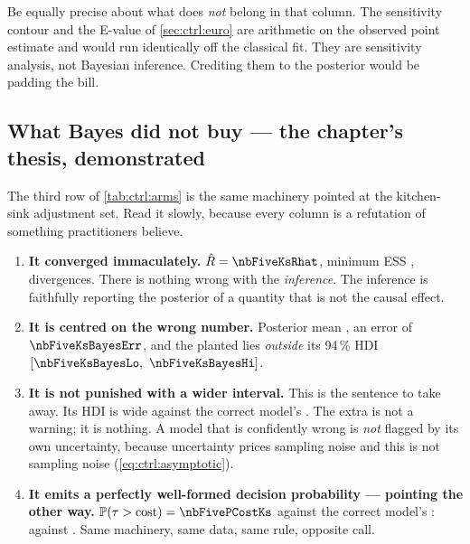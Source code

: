 Be equally precise about what does \emph{not} belong in that column. The sensitivity contour and
the E-value of \cref{sec:ctrl:euro} are arithmetic on the observed point estimate and would run
identically off the classical fit. They are sensitivity analysis, not Bayesian inference.
Crediting them to the posterior would be padding the bill.

\subsection*{What Bayes did not buy --- the chapter's thesis, demonstrated}

The third row of \cref{tab:ctrl:arms} is the same machinery pointed at the kitchen-sink
adjustment set. Read it slowly, because every column is a refutation of something practitioners
believe.

\begin{enumerate}[leftmargin=*, itemsep=.3em]
  \item \textbf{It converged immaculately.} $\hat R = \nbFiveKsRhat$, minimum ESS
        \nbFiveKsEss{}, \nbFiveKsDivergences{} divergences. There is nothing wrong with the
        \emph{inference}. The inference is faithfully reporting the posterior of a quantity that
        is not the causal effect.
  \item \textbf{It is centred on the wrong number.} Posterior mean \eur{\nbFiveKsBayesEst},
        an error of $\nbFiveKsBayesErr$, and the planted \eur{\nbFiveTrueAte} lies
        \emph{outside} its 94\,\% HDI $[\nbFiveKsBayesLo,\ \nbFiveKsBayesHi]$.
  \item \textbf{It is not punished with a wider interval.} This is the sentence to take away. Its
        HDI is \eur{\nbFiveKsBayesWidth} wide against the correct model's
        \eur{\nbFiveBayesWidth}. The extra \eur{\nbFiveKsWidthGap} is not a warning; it is
        nothing. A model
        that is confidently wrong is \emph{not} flagged by its own uncertainty, because
        uncertainty prices sampling noise and this is not sampling noise
        (\cref{eq:ctrl:asymptotic}).
  \item \textbf{It emits a perfectly well-formed decision probability --- pointing the other
        way.} $\Prob(\tau > \text{cost}) = \nbFivePCostKs$ against the correct model's
        \nbFivePCost{}: \nbFiveDecisionKs{} against \nbFiveDecision. Same machinery, same data,
        same rule, opposite call.
\end{enumerate}



